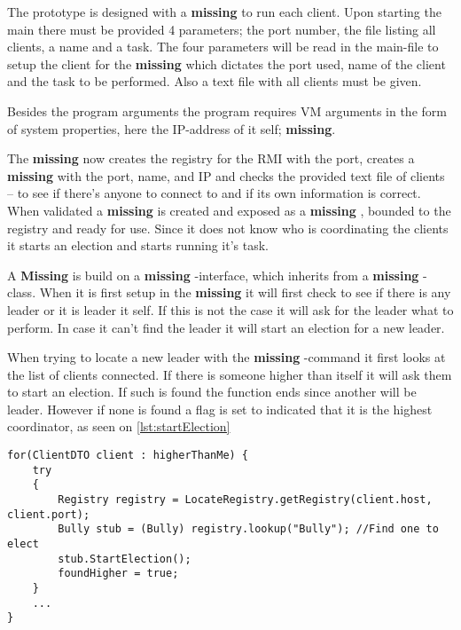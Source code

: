 \documentclass[Main]{subfiles}
\begin{document}
The prototype is designed with a \textbf{missing}
to run each client.
Upon starting the main there must be provided 4 parameters; the port number, the file listing all clients, a name and a task.
The four parameters will be read in the main-file to setup the client for the \textbf{missing}
which dictates the port used, name of the client and the task to be performed.
Also a text file with all clients must be given.

Besides the program arguments the program requires VM arguments in the form of system properties, here the IP-address of it self; \textbf{missing}.

The \textbf{missing} 
now creates the registry for the RMI with the port, creates a \textbf{missing}
with the port, name, and IP and checks the provided text file of clients -- to see if there's anyone to connect to and if its own information is correct.
When validated a \textbf{missing}
is created and exposed as a \textbf{missing} 
, bounded to the registry and ready for use. 
Since it does not know who is coordinating the clients it starts an election and starts running it's task.



A \textbf{Missing} 
is build on a \textbf{missing}
-interface, which inherits from a \textbf{missing}
-class.
When it is first setup in the \textbf{missing}
it will first check to see if there is any leader or it is leader it self.
If this is not the case it will ask for the leader what to perform.
In case it can't find the leader it will start an election for a new leader.



When trying to locate a new leader with the \textbf{missing}
-command it first looks at the list of clients connected. 
If there is someone higher than itself it will ask them to start an election.
If such is found the function ends since another will be leader.
However if none is found a flag is set to indicated that it is the highest coordinator, as seen on \codeTitle \ref{lst:startElection} 


\begin{lstlisting}[caption=Client: StartElection(), style=Code-Java, label=lst:startElection]
for(ClientDTO client : higherThanMe) {
	try 
	{
		Registry registry = LocateRegistry.getRegistry(client.host, client.port);
		Bully stub = (Bully) registry.lookup("Bully"); //Find one to elect
		stub.StartElection(); 
		foundHigher = true; 
	}
	...
}
\end{lstlisting}
\end{document}

